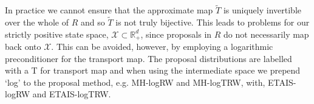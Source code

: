\documentclass[final]{siamltex}
\newcommand{\edit}[1]{{\color{red} #1}}
\newcommand\irregularcircle[2]{%
  \pgfextra {\pgfmathsetmacro\len{(#1)+rand*(#2)}}
  +(0:\len pt)
  \foreach \a in {10,20,...,350}{
    \pgfextra {\pgfmathsetmacro\len{(#1)+rand*(#2)}}
    -- +(\a:\len pt)
  } -- cycle
}
\begin{document}




In practice we cannot ensure that the approximate map $\tilde{T}$
is uniquely invertible over the whole of $R$ and so $\tilde{T}$ is not
truly bijective. This leads to problems for our strictly positive
state space, $\mathcal{X} \subset \mathbb{R}_+^d$, since proposals in
$R$ do not necessarily map back onto $\mathcal{X}$. \edit{This can be
  avoided, however, by employing a logarithmic preconditioner for the
  transport map. The proposal distributions are labelled with a T for transport map and when using the intermediate space we prepend `log' to the proposal method, e.g. MH-logRW and MH-logTRW, with, ETAIS-logRW and ETAIS-logTRW.}



\end{document}

